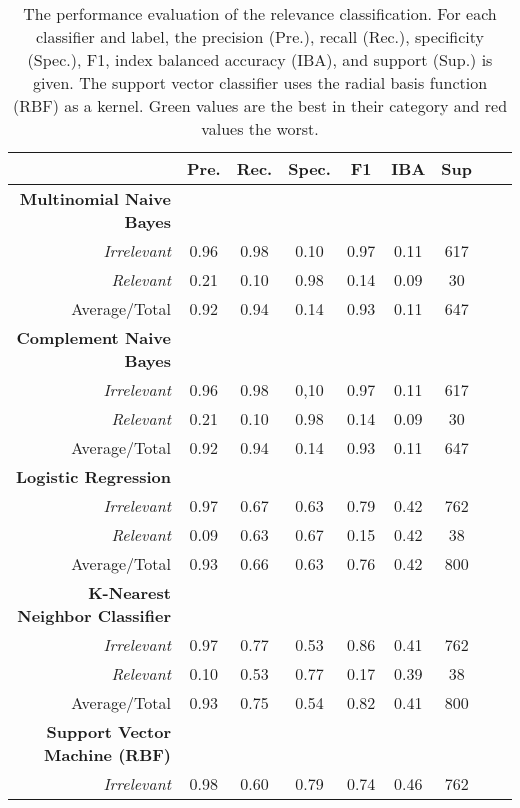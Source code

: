   \begin{table}
    \caption{The performance evaluation of the relevance classification. For each classifier and label, the precision (Pre.), recall (Rec.), specificity (Spec.), F1, index balanced accuracy (IBA), and support (Sup.) is given. The support vector classifier uses the radial basis function (RBF) as a kernel. Green values are the best in their category and red values the worst.}
    \centering
    \begin{tabular}{@{}rcccccccc@{}}
      \toprule
       & \textbf{Pre.} & \textbf{Rec.} & \textbf{Spec.}
      & \textbf{F1} &  \textbf{IBA}& \textbf{Sup} \\
      \midrule
      \textbf{Multinomial Naive Bayes}\\
      \emph{Irrelevant}& 0.96& 0.98&  0.10& 0.97& 0.11& 617 \\
      \emph{Relevant}& 0.21& 0.10&  0.98& 0.14& 0.09& 30 \\
      Average/Total& 0.92& 0.94& 0.14& 0.93& 0.11& 647 \vspace{2mm}\\
      \textbf{Complement Naive Bayes}\\
      \emph{Irrelevant}& 0.96& 0.98&  0,10& 0.97& 0.11& 617 \\
      \emph{Relevant}& 0.21& 0.10&  0.98& 0.14& 0.09& 30 \\
      Average/Total& 0.92& 0.94& 0.14& 0.93& 0.11& 647 \vspace{2mm}\\
      \textbf{Logistic Regression}\\
      \emph{Irrelevant}& 0.97& 0.67&  0.63& 0.79& 0.42& 762 \\
      \emph{Relevant}& 0.09& 0.63&  0.67& 0.15& 0.42& 38 \\
      Average/Total& 0.93& 0.66& 0.63& 0.76& 0.42& 800 \vspace{2mm}\\
      \textbf{K-Nearest Neighbor Classifier}\\
      \emph{Irrelevant}& 0.97& 0.77&  0.53& 0.86& 0.41& 762 \\
      \emph{Relevant}& 0.10& 0.53&  0.77& 0.17& 0.39& 38 \\
      Average/Total& 0.93& 0.75& 0.54& 0.82& 0.41& 800 \vspace{2mm}\\
      \textbf{Support Vector Machine (RBF)}\\
      \emph{Irrelevant}& 0.98& 0.60&  0.79& 0.74& 0.46& 762 \\

\end{tabular}
\end{table}
